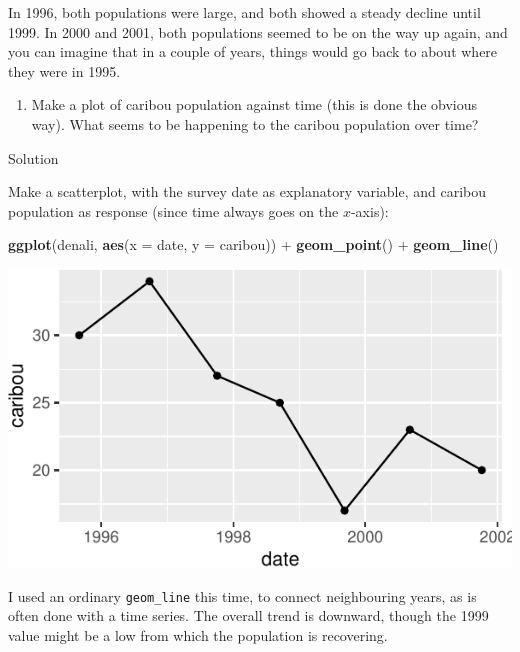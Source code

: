 \documentclass[]{tufte-book}
\newenvironment{Shaded}{}{}
\newcommand{\DataTypeTok}[1]{\textcolor[rgb]{0.56,0.13,0.00}{#1}}
\newcommand{\KeywordTok}[1]{\textcolor[rgb]{0.00,0.44,0.13}{\textbf{#1}}}
\newcommand{\NormalTok}[1]{#1}
\newcommand{\OperatorTok}[1]{\textcolor[rgb]{0.40,0.40,0.40}{#1}}
\newcommand{\StringTok}[1]{\textcolor[rgb]{0.25,0.44,0.63}{#1}}
\providecommand{\tightlist}{%
  \setlength{\itemsep}{0pt}\setlength{\parskip}{0pt}}
\theoremstyle{definition}
\theoremstyle{definition}
\theoremstyle{definition}
\theoremstyle{remark}
\begin{document}
In 1996, both populations were large, and both showed a steady decline
until 1999. In 2000 and 2001, both populations seemed to be on the way
up again, and you can imagine that in a couple of years, things would go
back to about where they were in 1995.

\begin{enumerate}
\def\labelenumi{(\alph{enumi})}
\setcounter{enumi}{5}
\tightlist
\item
  Make a plot of caribou population against time (this is done the
  obvious way). What seems to be happening to the caribou population
  over time?
\end{enumerate}

Solution

Make a scatterplot, with the survey date as explanatory variable, and
caribou population as response (since time always goes on the
\(x\)-axis):

\begin{Shaded}
\begin{Highlighting}[]
\KeywordTok{ggplot}\NormalTok{(denali, }\KeywordTok{aes}\NormalTok{(}\DataTypeTok{x =}\NormalTok{ date, }\DataTypeTok{y =}\NormalTok{ caribou)) }\OperatorTok{+}\StringTok{ }\KeywordTok{geom_point}\NormalTok{() }\OperatorTok{+}\StringTok{ }
\StringTok{    }\KeywordTok{geom_line}\NormalTok{()}
\end{Highlighting}
\end{Shaded}

\includegraphics{13-dates-and-times_files/figure-latex/unnamed-chunk-35-1}

I used an ordinary \texttt{geom\_line} this time, to connect
neighbouring years, as is often done with a time series. The overall
trend is downward, though the 1999 value might be a low from which the
population is recovering.
\end{document}

